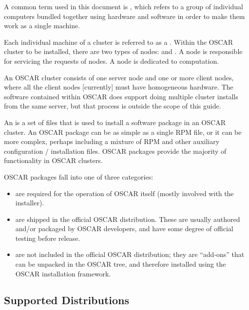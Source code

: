A common term used in this document is , which refers to
a group of individual computers bundled together using hardware and
software in order to make them work as a single machine.

Each individual machine of a cluster is referred to as a .
Within the OSCAR cluster to be installed, there are two types of
nodes:  and . A  node is
responsible for servicing the requests of  nodes.  A
 node is dedicated to computation.

An OSCAR cluster consists of one server node and one or more client
nodes, where all the client nodes [currently] must have homogeneous
hardware.  The software contained within OSCAR does support doing
multiple cluster installs from the same server, but that process is
outside the scope of this guide.

An  is a set of files that is used to install a
software package in an OSCAR cluster.  An OSCAR package can be as
simple as a single RPM file, or it can be more complex, perhaps
including a mixture of RPM and other auxiliary configuration /
installation files.  OSCAR packages provide the majority of
functionality in OSCAR clusters.

OSCAR packages fall into one of three categories:

\begin{itemize}
\item {} are required for the operation of OSCAR
  itself (mostly involved with the installer).

\item {} are shipped in the official OSCAR
  distribution.  These are usually authored and/or packaged by OSCAR
  developers, and have some degree of official testing before
  release.

\item {} are not included in the official
  OSCAR distribution; they are ``add-ons'' that can be unpacked in the
  OSCAR tree, and therefore installed using the OSCAR installation
  framework.
\end{itemize}


\subsection{Supported Distributions}

